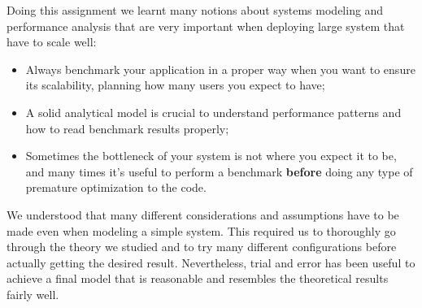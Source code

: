 \documentclass[11pt]{scrartcl} %
\begin{document}
Doing this assignment we learnt many notions about systems modeling and performance analysis that are very important when deploying large system that have to scale well:

\begin{itemize}
\item[\adforn{43}] Always benchmark your application in a proper way when you want to ensure its scalability, planning how many users you expect to have;
\item[\adforn{43}] A solid analytical model is crucial to understand performance patterns and how to read benchmark results properly;
\item[\adforn{43}] Sometimes the bottleneck of your system is not where you expect it to be, and many times it's useful to perform a benchmark \textbf{before} doing any type of premature optimization to the code.
\end{itemize}

We understood that many different considerations and assumptions have to be made even when modeling a simple system. This required us to thoroughly go through the theory we studied and to try many different configurations before actually getting the desired result. Nevertheless, trial and error has been useful to achieve a final model that is reasonable and resembles the theoretical results fairly well.
\end{document}
